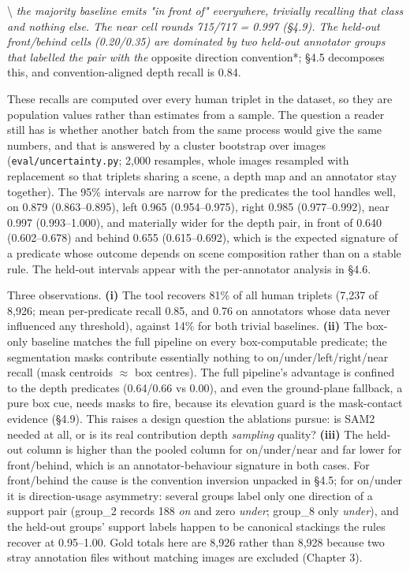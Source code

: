 \textbackslash{}\textit{ the majority baseline emits "in front of" everywhere, trivially recalling that class and nothing else. The near cell rounds 715/717 = 0.997 (\S4.9). The held-out front/behind cells (0.20/0.35) are dominated by two held-out annotator groups that labelled the pair with the }opposite direction convention*; \S4.5 decomposes this, and convention-aligned depth recall is 0.84.

These recalls are computed over every human triplet in the dataset, so they are population values rather than estimates from a sample. The question a reader still has is whether another batch from the same process would give the same numbers, and that is answered by a cluster bootstrap over images (\texttt{eval/uncertainty.py}; 2,000 resamples, whole images resampled with replacement so that triplets sharing a scene, a depth map and an annotator stay together). The 95\% intervals are narrow for the predicates the tool handles well, on 0.879 (0.863--0.895), left 0.965 (0.954--0.975), right 0.985 (0.977--0.992), near 0.997 (0.993--1.000), and materially wider for the depth pair, in front of 0.640 (0.602--0.678) and behind 0.655 (0.615--0.692), which is the expected signature of a predicate whose outcome depends on scene composition rather than on a stable rule. The held-out intervals appear with the per-annotator analysis in \S4.6.

Three observations. \textbf{(i)} The tool recovers 81\% of all human triplets (7,237 of 8,926; mean per-predicate recall 0.85, and 0.76 on annotators whose data never influenced any threshold), against 14\% for both trivial baselines. \textbf{(ii)} The box-only baseline matches the full pipeline on every box-computable predicate; the segmentation masks contribute essentially nothing to on/under/left/right/near recall (mask centroids $\approx$ box centres). The full pipeline's advantage is confined to the depth predicates (0.64/0.66 vs 0.00), and even the ground-plane fallback, a pure box cue, needs masks to fire, because its elevation guard is the mask-contact evidence (\S4.9). This raises a design question the ablations pursue: is SAM2 needed at all, or is its real contribution depth \textit{sampling} quality? \textbf{(iii)} The held-out column is higher than the pooled column for on/under/near and far lower for front/behind, which is an annotator-behaviour signature in both cases. For front/behind the cause is the convention inversion unpacked in \S4.5; for on/under it is direction-usage asymmetry: several groups label only one direction of a support pair (group\_2 records 188 \textit{on} and zero \textit{under}; group\_8 only \textit{under}), and the held-out groups' support labels happen to be canonical stackings the rules recover at 0.95--1.00. Gold totals here are 8,926 rather than 8,928 because two stray annotation files without matching images are excluded (Chapter 3).

